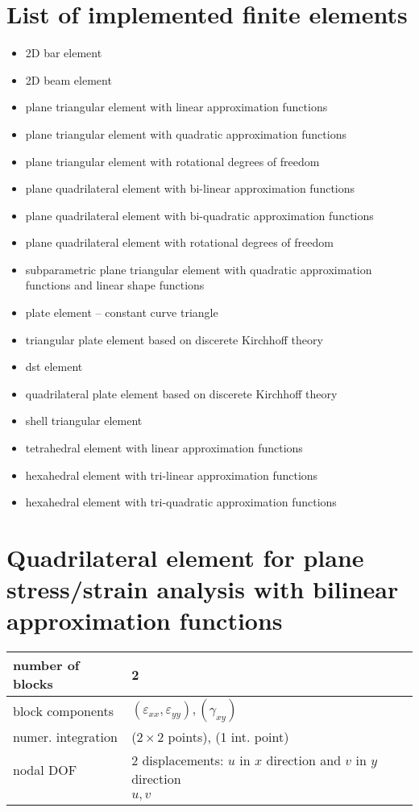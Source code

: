 \section{List of implemented finite elements}
\begin{itemize}
\item{2D bar element}
\item{2D beam element}
\item{plane triangular element with linear approximation functions}
\item{plane triangular element with quadratic approximation functions}
\item{plane triangular element with rotational degrees of freedom}
\item{plane quadrilateral element with bi-linear approximation functions}
\item{plane quadrilateral element with bi-quadratic approximation functions}
\item{plane quadrilateral element with rotational degrees of freedom}
\item{subparametric plane triangular element with quadratic approximation functions and linear shape functions}
\item{plate element -- constant curve triangle}
\item{triangular plate element based on discerete Kirchhoff theory}
\item{dst element}
\item{quadrilateral plate element based on discerete Kirchhoff theory}
\item{shell triangular element}
\item{tetrahedral element with linear approximation functions}
\item{hexahedral element with tri-linear approximation functions}
\item{hexahedral element with tri-quadratic approximation functions}
\end{itemize}

\section{Quadrilateral element for plane stress/strain ana\-lysis with bilinear approximation functions}
\label{sectrectelemlinfunct}

\begin{tabular}{|l|l|}
\hline
number of blocks & 2
\\ \hline
block components & $(\varepsilon_{xx},\varepsilon_{yy}), (\gamma_{xy})$
\\ \hline
numer. integration & ($2 \times 2$ points), (1 int. point)
\\ \hline
nodal DOF & 2 displacements: $u$ in $x$ direction and $v$ in $y$ direction
\\ \cline{2-2}
 & $u,v$
\\ \hline
\end{tabular}


